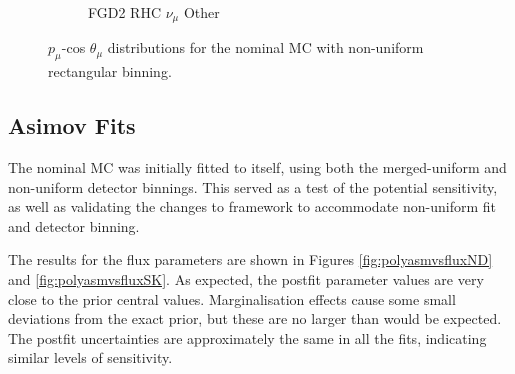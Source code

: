 \begin{figure}
\begin{subfigure}{.32\textwidth}
  \caption{FGD2 RHC $\nu_{\mu}$ Other}
  \label{fig:th2polynomFGD2_NuMuBkg_CCOther_in_AntiNu_Mode}
\end{subfigure}
\caption{$p_{\mu}$-cos $\theta_{\mu}$ distributions for the nominal MC with non-uniform rectangular binning.}
\label{fig:th2polynombin}
\end{figure}

\subsection{Asimov Fits}

The nominal MC was initially fitted to itself, using both the merged-uniform and non-uniform detector binnings. This served as a test of the potential sensitivity, as well as validating the changes to framework to accommodate non-uniform fit and detector binning. 

The results for the flux parameters are shown in Figures \ref{fig:polyasmvsfluxND} and \ref{fig:polyasmvsfluxSK}. As expected, the postfit parameter values are very close to the prior central values. Marginalisation effects cause some small deviations from the exact prior, but these are no larger than would be expected. The postfit uncertainties are approximately the same in all the fits, indicating similar levels of sensitivity.

